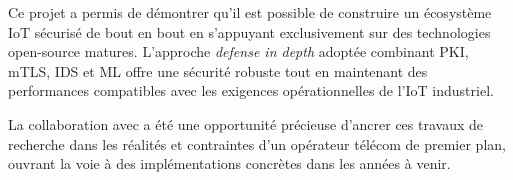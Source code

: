 Ce projet a permis de démontrer qu'il est possible de construire un écosystème IoT sécurisé de bout en bout en s'appuyant exclusivement sur des technologies open-source matures. L'approche \textit{defense in depth} adoptée  combinant PKI, mTLS, IDS et ML  offre une sécurité robuste tout en maintenant des performances compatibles avec les exigences opérationnelles de l'IoT industriel.

La collaboration avec \TT{} a été une opportunité précieuse d'ancrer ces travaux de recherche dans les réalités et contraintes d'un opérateur télécom de premier plan, ouvrant la voie à des implémentations concrètes dans les années à venir.
